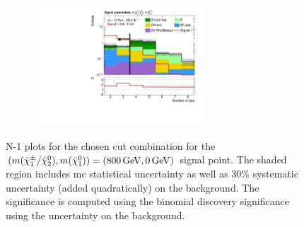\begin{figure}
\begin{subfigure}[b]{0.5\linewidth}
		\caption{}
	\end{subfigure}\hfill
	\begin{subfigure}[b]{0.5\linewidth}
		\centering\includegraphics[width=0.7\textwidth]{N-1_cut_scan/n1_800_0/nJet30}
		\caption{}
	\end{subfigure}

	\caption[N-1 plots for the chosen cut combination for the (800, 0) signal point]{N-1 plots for the chosen cut combination for the $(m(\charg/\neutr), m(\lsp)) = (\SI{800}{\GeV}, \SI{0}{\GeV})$ signal point. The shaded region includes \gls{mc} statistical uncertainty as well as 30\% systematic uncertainty (added quadratically) on the background. The significance is computed using the binomial discovery significance using the uncertainty on the background.}
	\label{fig:results_n1_800_0}
\end{figure}



